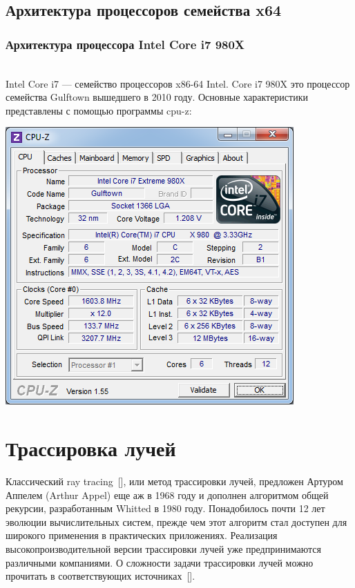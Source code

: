 \documentclass[12pt, a4paper]{article}
\begin{document}
\subsection{Архитектура процессоров семейства x64}
\subsubsection{Архитектура процессора Intel Core i7 980X}
\\
Intel Core i7 — семейство процессоров x86-64 Intel. Core i7 980X это процессор семейства Gulftown вышедшего в 2010 году. Основные характеристики представлены с помощью программы cpu-z:
\begin{center}
\includegraphics[scale=1]{imgs/cpu-z.png} 
\end{center}


\newpage
\section{Трассировка лучей}
Классический ray tracing~[\cite{sivakov}], или метод трассировки лучей, предложен Артуром Аппелем (Arthur Appel) еще аж в 1968 году и дополнен алгоритмом общей рекурсии, разработанным Whitted в 1980 году. Понадобилось почти 12 лет эволюции вычислительных систем, прежде чем этот алгоритм стал доступен для широкого применения в практических приложениях. Реализация высокопроизводительной версии трассировки лучей уже предпринимаются различными компаниями. О сложности задачи трассировки лучей можно прочитать в соответствующих источниках~[\cite{biovulf}].
\end{document}
